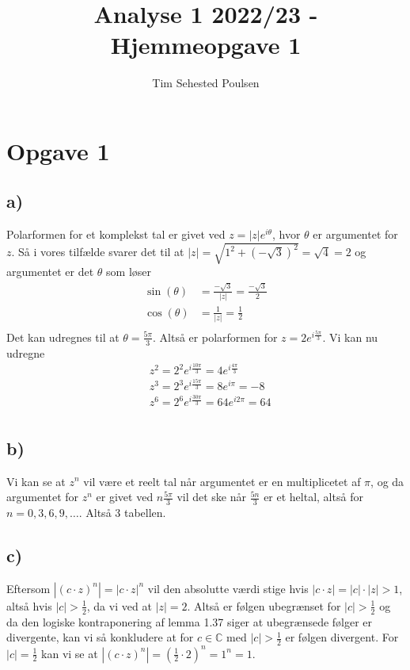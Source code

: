 \documentclass{article}
\title{Analyse 1 2022/23 - Hjemmeopgave 1}
\author{Tim Sehested Poulsen}
\newcommand{\m}[1]{\mathbb{#1}}
\newcommand{\mC}{\m{C}}
\begin{document}
\section*{Opgave 1}
\subsection*{a)}
Polarformen for et komplekst tal er givet ved $z = |z|e^{i\theta}$, hvor $\theta$ er argumentet for $z$.
Så i vores tilfælde svarer det til at $|z| = \sqrt{1^2 + (-\sqrt{3})^2} = \sqrt{4}= 2$ og argumentet er det $\theta$ som løser
\begin{align*}
\sin(\theta) &= \frac{-\sqrt{3}}{|z|} = \frac{-\sqrt{3}}{2} \\
\cos(\theta) &= \frac{1}{|z|} = \frac{1}{2} \\
\end{align*}
Det kan udregnes til at $\theta = \frac{5\pi}{3}$. Altså er polarformen for $z= 2e^{i\frac{5\pi}{3}}$.
Vi kan nu udregne 
\begin{align*}
    &z^2 = 2^2e^{i\frac{10\pi}{3}} = 4e^{i\frac{4\pi}{3}} \\
    &z^3 = 2^3e^{i\frac{15\pi}{3}} = 8 e^{i\pi} = -8 \\
    &z^6 = 2^6e^{i\frac{30\pi}{3}} = 64 e^{i 2\pi} = 64 \\
\end{align*}
\subsection*{b)}
Vi kan se at $z^n$ vil være et reelt tal når argumentet er en multiplicetet af $\pi$, og da argumentet for 
$z^n$ er givet ved $n\frac{5\pi}{3}$ vil det ske når $\frac{5n}{3}$ er et heltal, altså for $n=0,3,6,9,\dots$. Altså 3 tabellen.

\subsection*{c)}
Eftersom $|(c\cdot z)^n| = |c\cdot z|^n$ vil den absolutte værdi stige hvis $|c \cdot z| = |c| \cdot |z| > 1$, altså hvis $|c| > \frac{1}{2}$, 
da vi ved at $|z| = 2$. Altså er følgen ubegrænset for $|c| > \frac{1}{2}$ og da den logiske kontraponering af lemma 1.37 siger at
ubegrænsede følger er divergente, kan vi så konkludere at for $c \in \mC$ med $|c| > \frac{1}{2}$ er følgen divergent.
For $|c| =\frac{1}{2}$ kan vi se at $|(c \cdot z)^n| = (\frac{1}{2} \cdot 2)^n = 1^n = 1$.
\end{document}
